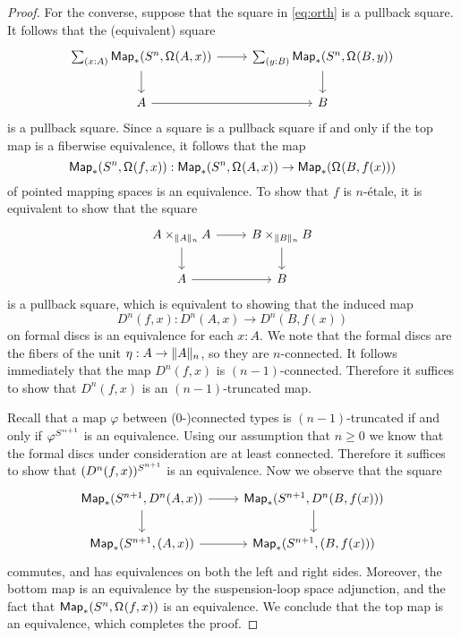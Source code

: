 \documentclass[9pt,twosided]{amsart}
\begin{document}
\begin{proof}
  For the converse, suppose that the square in \cref{eq:orth} is a pullback square. It follows that the (equivalent) square
  \begin{equation*}
    \begin{tikzcd}
      \sm{x:A}\mathsf{Map}_\ast(\sphere{n},\loopspace{A,x}) \arrow[r] \arrow[d] & \sm{y:B} \mathsf{Map}_\ast(\sphere{n},\loopspace{B,y}) \arrow[d] \\
      A \arrow[r] & B
    \end{tikzcd}
  \end{equation*}
is a pullback square.
  Since a square is a pullback square if and only if the top map is a fiberwise equivalence, it follows that the map
  \begin{equation*}
    \mathsf{Map}_\ast(S^{n},\mathsf{\Omega}^{}(f,x)):\mathsf{Map}_\ast(S^{n},\mathsf{\Omega}^{}(A,x)) \to \mathsf{Map}_\ast(\mathsf{\Omega}^{}(B,f(x)))
  \end{equation*}
  of pointed mapping spaces is an equivalence. To show that $f$ is $n$-\'etale, it is equivalent to show that the square
  \begin{equation*}
    \begin{tikzcd}
      A\times_{\trunc{n}{A}} A \arrow[r] \arrow[d] & B \times_{\trunc{n}{B}} B \arrow[d] \\
      A \arrow[r] & B
    \end{tikzcd}
  \end{equation*}
  is a pullback square, which is equivalent to showing that the induced map
  \begin{equation*}
    D^{n}(f,x):D^{n}(A,x)\to D^{n}(B,f(x))
  \end{equation*}
  on formal discs is an equivalence for each $x:A$. We note that the formal discs are the fibers of the unit $\eta:A \to \trunc{n}{A}$, so they are $n$-connected. It follows immediately that the map $D^{n}(f,x)$ is $(n-1)$-connected. Therefore it suffices to show that $D^{n}(f,x)$ is an $(n-1)$-truncated map.

  Recall that a map $\varphi$ between ($0$-)connected types is $(n-1)$-truncated if and only if $\varphi^{S^{n+1}}$ is an equivalence. Using our assumption that $n\geq 0$ we know that the formal discs under consideration are at least connected. Therefore it suffices to show that $(D^{n}(f,x))^{S^{n+1}}$ is an equivalence. Now we observe that the square
  \begin{equation*}
    \begin{tikzcd}
      \mathsf{Map}_\ast(\sphere{n+1},D^{n}(A,x)) \arrow[r] \arrow[d] & \mathsf{Map}_\ast(\sphere{n+1},D^{n}(B,f(x))) \arrow[d] \\
      \mathsf{Map}_\ast(\sphere{n+1},(A,x)) \arrow[r] & \mathsf{Map}_\ast(\sphere{n+1},(B,f(x)))
    \end{tikzcd}
  \end{equation*}
  commutes, and has equivalences on both the left and right sides. Moreover, the bottom map is an equivalence by the suspension-loop space adjunction, and the fact that $\mathsf{Map}_\ast(S^{n},\mathsf{\Omega}^{}(f,x))$ is an equivalence. We conclude that the top map is an equivalence, which completes the proof.
\end{proof}
\end{document}
